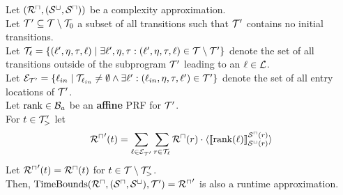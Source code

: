 \begin{theorem}[TimeBounds]
  Let $({\mathcal{R}^\sqcap}, {({\mathcal{S}^\sqcup}, {\mathcal{S}^\sqcap})})$ be a complexity approximation. \\
  Let $\mathcal{T}' \subseteq \mathcal{T} \setminus \mathcal{T}_0$ a subset of all transitions such that $\mathcal{T}'$ contains no initial transitions. \\
  Let $\mathcal{T}_{\ell} = \lbrace (\ell', \eta, \tau, \ell) \mid \exists \ell', \eta, \tau: (\ell', \eta, \tau, \ell) \in \mathcal{T} \setminus \mathcal{T}' \rbrace$ denote the set of all transitions outside of the subprogram $\mathcal{T}'$ leading to an $\ell \in \mathcal{L}$. \\
  Let $\mathcal{E}_{\mathcal{T}'} = \lbrace \ell_{in} \mid \mathcal{T}_{\ell_{in}} \neq \emptyset \wedge \exists \ell': (\ell_{in}, \eta, \tau, \ell') \in \mathcal{T}' \rbrace$ denote the set of all entry locations of $\mathcal{T}'$. \\
  Let $\text{rank} \in \mathcal{B}_a$ be an \textbf{affine} PRF for $\mathcal{T}'$. \\
  For $t \in \mathcal{T}'_>$ let
  \[ {\mathcal{R}^\sqcap}'(t) = \sum_{\ell \in \mathcal{E}_{\mathcal{T}'}} \sum_{r \in \mathcal{T}_\ell} {\mathcal{R}^\sqcap}(r) \cdot \langle\llbracket \text{rank}(\ell) \rrbracket_{{\mathcal{S}^\sqcup}(r)}^{{\mathcal{S}^\sqcap}(r)}\rangle \]
  Let ${\mathcal{R}^\sqcap}'(t) = {\mathcal{R}^\sqcap}(t)$ for $t \in \mathcal{T} \setminus \mathcal{T}'_>$. \\
  Then, $\text{TimeBounds}({\mathcal{R}^\sqcap}, ({\mathcal{S}^\sqcap}, {\mathcal{S}^\sqcup}), \mathcal{T}') = {\mathcal{R}^\sqcap}'$ is also a runtime approximation.
\end{theorem}
